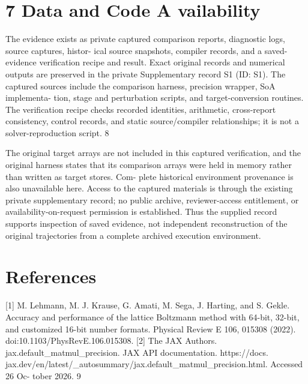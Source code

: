 \documentclass[11pt]{article}
\begin{document}
\section*{7 Data and Code A vailability}

The evidence exists as private captured comparison reports, diagnostic logs, source captures, histor-
ical source snapshots, compiler records, and a saved-evidence verification recipe and result. Exact
original records and numerical outputs are preserved in the private Supplementary record S1 (ID:
S1). The captured sources include the comparison harness, precision wrapper, SoA implementa-
tion, stage and perturbation scripts, and target-conversion routines. The verification recipe checks
recorded identities, arithmetic, cross-report consistency, control records, and static source/compiler
relationships; it is not a solver-reproduction script.
8

The original target arrays are not included in this captured verification, and the original harness
states that its comparison arrays were held in memory rather than written as target stores. Com-
plete historical environment provenance is also unavailable here. Access to the captured materials is
through the existing private supplementary record; no public archive, reviewer-access entitlement,
or availability-on-request permission is established. Thus the supplied record supports inspection of
saved evidence, not independent reconstruction of the original trajectories from a complete archived
execution environment.

\section*{References}

[1] M. Lehmann, M. J. Krause, G. Amati, M. Sega, J. Harting, and S. Gekle. Accuracy and
performance of the lattice Boltzmann method with 64-bit, 32-bit, and customized 16-bit number
formats. Physical Review E 106, 015308 (2022). doi:10.1103/PhysRevE.106.015308.
[2] The JAX Authors. jax.default\_matmul\_precision. JAX API documentation. https://docs.
jax.dev/en/latest/\_autosummary/jax.default\_matmul\_precision.html. Accessed 26 Oc-
tober 2026.
9
\end{document}
